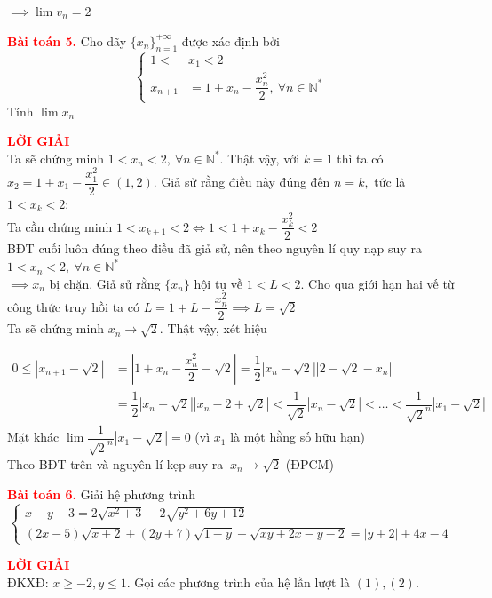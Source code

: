 \documentclass[a4paper, 12pt]{article}
\numberwithin{equation}{section}
\begin{document}
    $\implies \lim v_n = 2$
    \newpage
    \begin{BoxRed}
		\textbf{\textcolor{red}{Bài toán 5.}}
		Cho dãy $\{ x_n \}_{n=1}^{+\infty}$ được xác định bởi
	\[ \left\{
	\begin{aligned}
		1 <& x_1 < 2 \\
		x_{n+1} &= 1 + x_n - \dfrac{x_n^2}{2}, \ \forall n \in \mathbb{N}^*
	\end{aligned}
	\right. \]
	Tính $\lim x_n$
	\end{BoxRed}
	\textbf{\textcolor{red}{LỜI GIẢI}} \\
    Ta sẽ chứng minh $1 < x_n < 2, \ \forall n \in \mathbb{N}^*$. Thật vậy, với $k=1$ thì ta có\\ $x_2 = 1 + x_1 - \dfrac{x_1^2}{2} \in (1, 2).$ Giả sử rằng điều này đúng đến $n=k,$ tức là \\ $1 < x_k < 2;$
    \\Ta cần chứng minh
    $ 1 < x_{k+1} < 2 \iff 1 < 1 + x_k - \dfrac{x_k^2}{2} < 2$\\
    BĐT cuối luôn đúng theo điều đã giả sử, nên theo nguyên lí quy nạp suy ra \\ $1 < x_n < 2,\ \forall n \in \mathbb{N}^*$\\
    $\implies x_n$ bị chặn. Giả sử rằng $\{x_n\}$ hội tụ về $1 < L < 2$. Cho qua giới hạn hai vế từ công thức truy hồi ta có
    $ L = 1 + L - \dfrac{x_n^2}{2} \implies L = \sqrt{2}$\\
    Ta sẽ chứng minh $x_n \rightarrow \sqrt{2}$. Thật vậy, xét hiệu

    $
    \begin{aligned}
    0 \leq \left|x_{n+1} - \sqrt{2}\right| &= \left|1 + x_n -\dfrac{x_n^2}{2} - \sqrt{2}\right| = \dfrac{1}{2}\left|x_n - \sqrt{2}\right|\left|2 - \sqrt{2}     - x_n\right| \\ 
    &=\dfrac{1}{2}\left|x_n - \sqrt{2}\right|\left|x_ 
    n - 2 + \sqrt{2}\right| < \dfrac{1}{\sqrt{2}}\left|x_n - \sqrt{2}\right| < \dots < \dfrac{1}{\sqrt{2}^n}\left|x_1 - \sqrt{2}\right|
    \end{aligned}$\\
    Mặt khác $\lim \dfrac{1}{\sqrt{2}^n}\left|x_1 - \sqrt{2}\right| = 0$ (vì $x_1$ là một hằng số hữu hạn) \\
    Theo BĐT trên và nguyên lí kẹp suy ra $ \ x_n \rightarrow \sqrt{2} $ (ĐPCM)
    \newpage
    \begin{BoxRed}
	\textbf{\textcolor{red}{Bài toán 6.}} Giải hệ phương trình 
		\[\left\{
        \begin{gathered}
            x - y -3 = 2\sqrt{x^2 + 3} - 2\sqrt{y^2 + 6y + 12} \\
            (2x -5)\sqrt{x + 2} + (2y + 7)\sqrt{1 - y} + \sqrt{xy + 2x - y -2} = \left|y + 2\right| + 4x - 4
        \end{gathered}
        \right.\]
	\end{BoxRed}
	\textbf{\textcolor{red}{LỜI GIẢI}} \\
    ĐKXĐ: $x \geq -2, y \leq 1.$
	Gọi các phương trình của hệ lần lượt là $(1), (2).$
    
\end{document}

